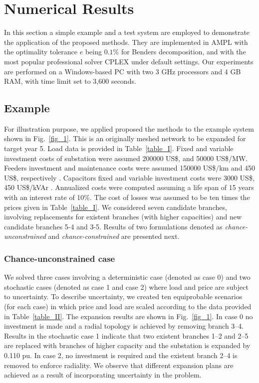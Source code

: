 \documentclass[journal]{IEEEtran}
\theoremstyle{remark}
\begin{document}
\section{Numerical Results}
\label{sect_numerical}
In this section a simple example and a test system are employed to demonstrate the application of the proposed methods. They are implemented in AMPL with the optimality tolerance $e$ being $0.1\%$ for Benders decomposition, and with the most popular professional solver CPLEX \citep{Fourer} under default settings. Our experiments are performed on a Windows-based PC with two 3 GHz processors and 4 GB RAM, with time limit set to 3,600 seconds.
\subsection{Example}
For illustration purpose, we applied proposed the methods to the example system shown in Fig.~\ref{fig_1}. This is an originally meshed network to be expanded for target year 5. Load data is provided in Table~\ref{table_I}. Fixed and variable investment costs of substation were assumed 200000 US\$, and 50000 US\$/MW. Feeders investment and maintenance costs were assumed 150000 US\$/km and 450 US\$, respectively \citep{Bhattacharya}. Capacitors fixed and variable investment costs were 3000 US\$, 450 US\$/kVAr  \citep{Chen}. Annualized costs were computed assuming a life span of 15 years with an interest rate of 10\%. The cost of losses was assumed to be ten times the prices given in Table~\ref{table_I}.
We considered seven candidate branches, involving replacements for existent branches (with higher capacities) and new candidate branches 5-4 and 3-5. Results of two formulations denoted as \textit{chance-unconstrained} and \textit{chance-constrained} are presented next.

\subsubsection{Chance-unconstrained case}
We solved three cases involving a deterministic case (denoted as case 0) and two stochastic cases (denoted as case 1 and case 2) where load and price are subject to uncertainty. To describe uncertainty, we created ten equiprobable scenarios (for each case) in which price and load are scaled according to the data provided in Table~\ref{table_II}.
The expansion results are shown in Fig.~\ref{fig_1}. In case 0 no investment is made and a radial topology is achieved by removing branch 3--4. Results in the stochastic case 1 indicate that two existent branches 1--2 and 2--5 are replaced with branches of higher capacity and the substation is expanded by 0.110 pu. In case 2, no investment is required and the existent branch 2--4 is removed to enforce radiality. We observe that different expansion plans are achieved as a result of incorporating uncertainty in the problem.
\end{document}
